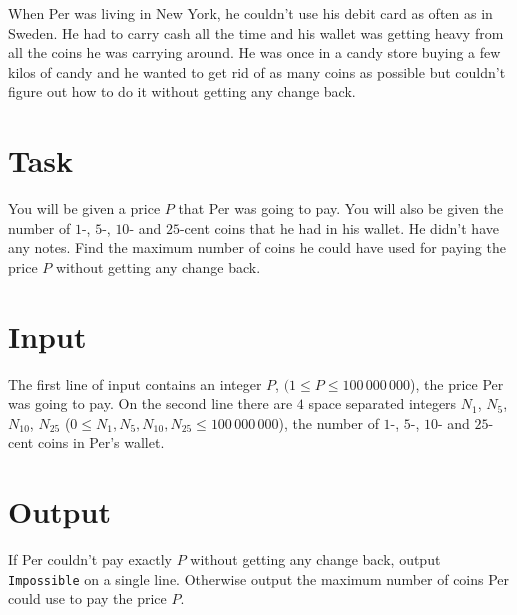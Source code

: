 When Per was living in New York, he couldn't use his debit card as often as in Sweden. He had to carry cash all
the time and his wallet was getting heavy from all the coins he was carrying around. He was once in a candy store
buying a few kilos of candy and he wanted to get rid of as many coins as possible but couldn’t figure out how to
do it without getting any change back.

\section*{Task}
You will be given a price $P$ that Per was going to pay.
You will also be given the number of $1$-, $5$-, $10$- and $25$-cent coins that he had in his wallet.
He didn't have any notes. Find the maximum number of coins he could have used
for paying the price $P$ without getting any change back.

\section*{Input}
The first line of input contains an integer $P$, $(1 \le P \le 100\,000\,000$), the price Per was going to pay.
On the second line there are $4$ space separated integers $N_1$, $N_5$, $N_{10}$, $N_{25}$ ($0 \le N_1, N_5, N_{10}, N_{25} \le 100\,000\,000$), the number of
$1$-, $5$-, $10$- and $25$-cent coins in Per's wallet.

\section*{Output}
If Per couldn't pay exactly $P$ without getting any change back, output \texttt{Impossible} on a single line.
Otherwise output the maximum number of coins Per could use to pay the price $P$.

